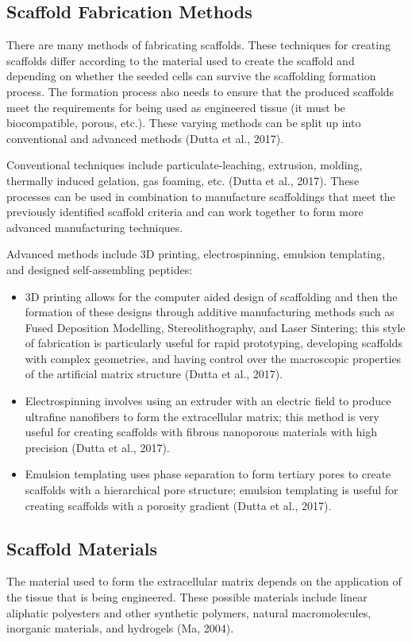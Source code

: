 \subsection{Scaffold Fabrication Methods}
There are many methods of fabricating scaffolds. These techniques for creating scaffolds differ according to the material used to create the scaffold and depending on whether the seeded cells can survive the scaffolding formation process. The formation process also needs to ensure that the produced scaffolds meet the requirements for being used as engineered tissue (it must be biocompatible, porous, etc.). These varying methods can be split up into conventional and advanced methods (Dutta et al., 2017).

Conventional techniques include particulate-leaching, extrusion, molding, thermally induced gelation, gas foaming, etc. (Dutta et al., 2017). These processes can be used in combination to manufacture scaffoldings that meet the previously identified scaffold criteria and can work together to form more advanced manufacturing techniques.

Advanced methods include 3D printing, electrospinning, emulsion templating, and designed self-assembling peptides:

\begin{itemize}
  \item 3D printing allows for the computer aided design of scaffolding and then the formation of these designs through additive manufacturing methods such as Fused Deposition Modelling, Stereolithography, and Laser Sintering; this style of fabrication is particularly useful for rapid prototyping, developing scaffolds with complex geometries, and having control over the macroscopic properties of the artificial matrix structure (Dutta et al., 2017). 
  \item Electrospinning involves using an extruder with an electric field to produce ultrafine nanofibers to form the extracellular matrix; this method is very useful for creating scaffolds with fibrous nanoporous materials with high precision (Dutta et al., 2017). 
  \item Emulsion templating uses phase separation to form tertiary pores to create scaffolds with a hierarchical pore structure; emulsion templating is useful for creating scaffolds with a porosity gradient (Dutta et al., 2017). 
\end{itemize}

\subsection{Scaffold Materials}
The material used to form the extracellular matrix depends on the application of the tissue that is being engineered. These possible materials include linear aliphatic polyesters and other synthetic polymers, natural macromolecules, inorganic materials, and hydrogels (Ma, 2004).

